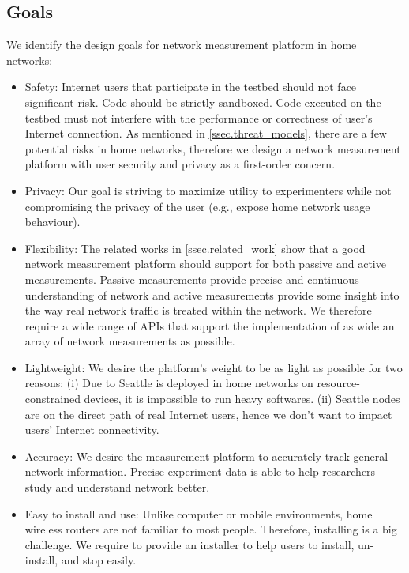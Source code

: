 \subsection{Goals}
\label{ssec.goals}
We identify the design goals for network measurement platform in home 
networks:
\begin{itemize}
\item Safety: Internet users that participate in the testbed should not face significant risk. Code should be strictly sandboxed. Code executed on the testbed must not interfere with the performance or correctness of user's Internet connection. As mentioned in \ref{ssec.threat_models}, there are a few potential risks in home networks, therefore we design a network measurement platform with user security and privacy as a first-order concern.

\item Privacy: Our goal is striving to maximize utility to experimenters while not compromising the privacy of the user (e.g., expose home network usage behaviour).

\item Flexibility: The related works in \ref{ssec.related_work} show that a good network measurement platform should support for both passive and active measurements. Passive measurements provide precise and continuous understanding of network and active measurements provide some insight into the way real network traffic is treated within the network. We therefore require a wide range of APIs that support the implementation of as wide an array of network measurements as possible.

\item Lightweight: We desire the platform's weight to be as light as possible for two reasons: (i) Due to Seattle is deployed in home networks on resource-constrained devices, it is impossible to run heavy softwares. (ii) Seattle nodes are on the direct path of real Internet users, hence we don't want to impact users' Internet connectivity.

\item Accuracy: We desire the measurement platform to accurately track 
general network information. Precise experiment data is able to help researchers study and understand network better.

\item Easy to install and use: Unlike computer or mobile environments, home wireless routers are not familiar to most people. Therefore, installing is a big challenge. We require to provide an installer to help users to install, un-install, and stop easily.
\end{itemize}


